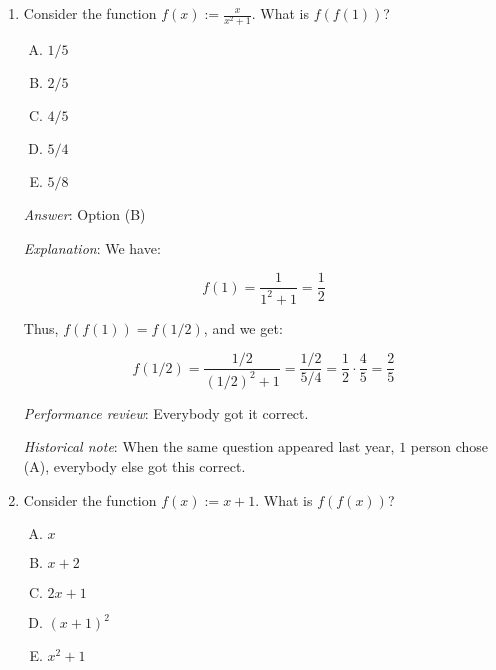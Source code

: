 \documentclass[10pt]{amsart}
\begin{document}
\begin{enumerate}
  {\em Answer}: Option (E)

  {\em Explanation}: We have $f(f(x)) = f(x^2 + 1) = (x^2 + 1)^2 + 1 =
  x^4 + 2x^2 + 1 + 1$, which simplifies to option (E).

  {\em The other choices}:

  Option (A) is $(x^2 + 1) + 1 = x^2 + 2$. The error here is is not
  squaring the $x^2 + 1$ expression.

  Option (D) is $(x^2 + 1)^2 = x^4 + 2x^2 + 1$. The error here is in
  forgetting to add the $1$ at the end.

  Options (B) and (C) are like options (D) and (E), with an error in
  the coefficient of $x^2$.

  {\em Performance review}: Everybody got it correct.

  {\em Historical note}: When this same quiz question was asked last
  year, everybody got it correct.

\item Consider the function $f(x) := \frac{x}{x^2 + 1}$. What is $f(f(1))$?

  \begin{enumerate}[(A)]
  \item $1/5$
  \item $2/5$
  \item $4/5$
  \item $5/4$
  \item $5/8$
  \end{enumerate}

  {\em Answer}: Option (B)

  {\em Explanation}: We have:

  $$f(1) = \frac{1}{1^2 + 1} = \frac{1}{2}$$

  Thus, $f(f(1)) = f(1/2)$, and we get:

  $$f(1/2) = \frac{1/2}{(1/2)^2 + 1} = \frac{1/2}{5/4} = \frac{1}{2} \cdot \frac{4}{5} = \frac{2}{5}$$

  {\em Performance review}: Everybody got it correct.

  {\em Historical note}: When the same question appeared last year, $1$
  person chose (A), everybody else got this correct.

\item Consider the function $f(x) := x + 1$. What is $f(f(x))$?

  \begin{enumerate}[(A)]
  \item $x$
  \item $x + 2$
  \item $2x + 1$
  \item $(x + 1)^2$
  \item $x^2 + 1$
  \end{enumerate}


\end{enumerate}
\end{document}

